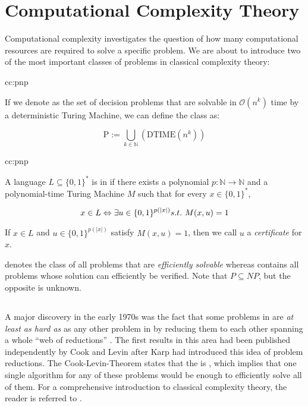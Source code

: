 \section{Computational Complexity Theory}

Computational complexity investigates the question of how many computational resources are required to solve a specific problem. 
We are about to introduce two of the most important classes of problems in classical complexity theory:

\begin{cc}{cc:pnp}

    If we denote \DTIME as the set of decision problems that are solvable in $\mathcal{O}(n^k)$ time by a deterministic Turing Machine, we can define the class \Pt as:

    \[ \mathrm{P} := \bigcup_{k \in \mathbb{N}}(\mathrm{DTIME}(n^k))\]

\end{cc}

\begin{cc}{cc:pnp}

    A language $L \subseteq \{0,1\}^*$ is in \Pt if there exists a polynomial $p: \mathbb{N} \rightarrow \mathbb{N}$ and a polynomial-time Turing Machine $M$ such that for every $x \in \{0,1\}^*$,

    \[ x \in L \Leftrightarrow \exists u \in \{0,1\}^{p(|x|)} \mathnormal{s.t.~} M(x,u) = 1 \]

    \noindent If $x \in L$ and $u \in \{ 0,1 \}^{p(|x|)}$ satisfy $M(x,u) = 1$, then we call $u$  a \textit{certificate} for $x$.
\end{cc}

\Pt denotes the class of all problems that are \textit{efficiently solvable} whereas \NP contains all problems whose solution can efficiently be verified. Note that $P \subseteq NP$, but the opposite is unknown.

\subsection{\NPcn}
A major discovery in the early 1970s was the fact that some problems in \NP are \textit{at least as hard as} as any other problem in \NP by reducing them to each other spanning a whole ``web of reductions'' \cite{Arora2006}.
The first results in this area had been published independently by Cook \cite{Cook1971} and Levin \cite{Levin1973} after Karp \cite{Karp1972} had introduced this idea of problem reductions.
The Cook-Levin-Theorem \cite{Cook1971} states that the \SAT is \NPc, which implies that one single algorithm for any of these problems would be enough to efficiently solve all of them. 
For a comprehensive introduction to classical complexity theory, the reader is referred to \cite{Arora2006}.

